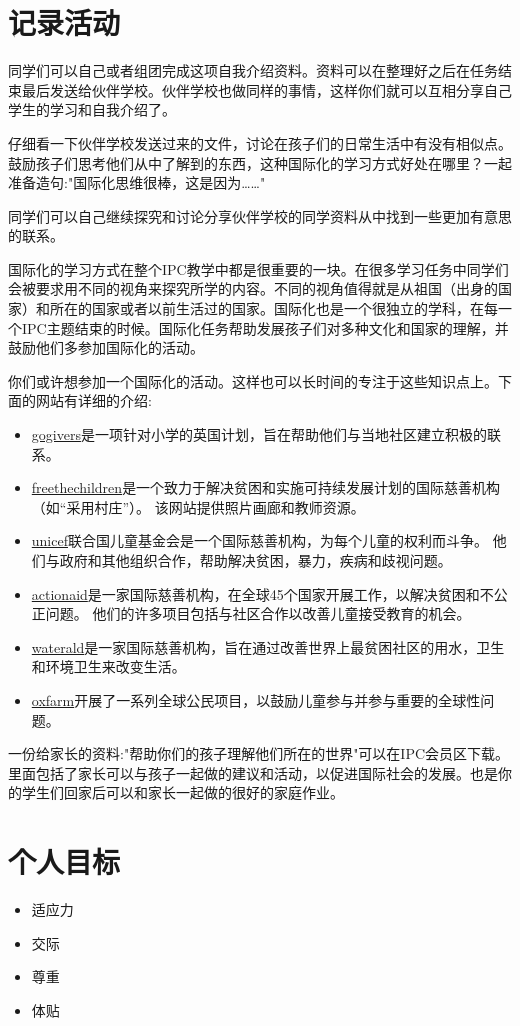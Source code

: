 \section{记录活动}
    同学们可以自己或者组团完成这项自我介绍资料。资料可以在整理好之后在任务结束最后发送给伙伴学校。伙伴学校也做同样的事情，这样你们就可以互相分享自己学生的学习和自我介绍了。\par
    仔细看一下伙伴学校发送过来的文件，讨论在孩子们的日常生活中有没有相似点。鼓励孩子们思考他们从中了解到的东西，这种国际化的学习方式好处在哪里？一起准备造句:"国际化思维很棒，这是因为……"\par
    同学们可以自己继续探究和讨论分享伙伴学校的同学资料从中找到一些更加有意思的联系。\par
    国际化的学习方式在整个IPC教学中都是很重要的一块。在很多学习任务中同学们会被要求用不同的视角来探究所学的内容。不同的视角值得就是从祖国（出身的国家）和所在的国家或者以前生活过的国家。国际化也是一个很独立的学科，在每一个IPC主题结束的时候。国际化任务帮助发展孩子们对多种文化和国家的理解，并鼓励他们多参加国际化的活动。\par
    你们或许想参加一个国际化的活动。这样也可以长时间的专注于这些知识点上。下面的网站有详细的介绍:\par
    \begin{itemize}
      \item \href{http://www.gogivers.org/}{gogivers}是一项针对小学的英国计划，旨在帮助他们与当地社区建立积极的联系。
      \item \href{http://www.freethechildren.com/}{freethechildren}是一个致力于解决贫困和实施可持续发展计划的国际慈善机构（如“采用村庄”）。 该网站提供照片画廊和教师资源。
      \item \href{http://www.unicef.org/}{unicef}联合国儿童基金会是一个国际慈善机构，为每个儿童的权利而斗争。 他们与政府和其他组织合作，帮助解决贫困，暴力，疾病和歧视问题。
      \item \href{http://www.actionaid.org/what-we-do/education}{actionaid}是一家国际慈善机构，在全球45个国家开展工作，以解决贫困和不公正问题。 他们的许多项目包括与社区合作以改善儿童接受教育的机会。
      \item \href{http://www.wateraid.org/}{waterald}是一家国际慈善机构，旨在通过改善世界上最贫困社区的用水，卫生和环境卫生来改变生活。
      \item \href{http://www.oxfam.org.uk/education/global-citizenship}{oxfarm}开展了一系列全球公民项目，以鼓励儿童参与并参与重要的全球性问题。
    \end{itemize}  
    
    \begin{note}
      一份给家长的资料:"帮助你们的孩子理解他们所在的世界"可以在IPC会员区下载。里面包括了家长可以与孩子一起做的建议和活动，以促进国际社会的发展。也是你的学生们回家后可以和家长一起做的很好的家庭作业。
    \end{note}  

\section{个人目标}
    \begin{itemize}
      \item 适应力
      \item 交际 
      \item 尊重
      \item 体贴  
     \end{itemize} 
